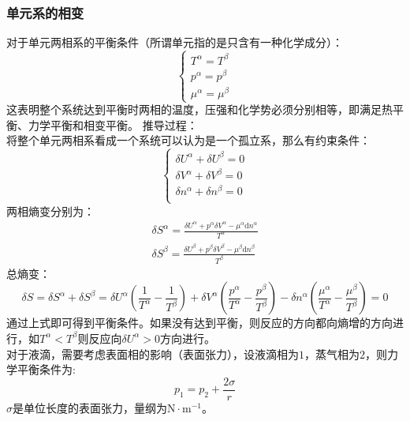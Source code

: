 \documentclass[12pt]{article}
\begin{document}
\subsubsection{单元系的相变}
\noindent
对于单元两相系的平衡条件（所谓单元指的是只含有一种化学成分）：
\begin{equation}
	\left\{\begin{split}
			T^\alpha=T^\beta\\
			p^\alpha=p^\beta\\
			\mu^\alpha=\mu^\beta
		\end{split}
	\label{x16}
	\right.
\end{equation}
这表明整个系统达到平衡时两相的温度，压强和化学势必须分别相等，即满足热平衡、力学平衡和相变平衡。
推导过程：\\
将整个单元两相系看成一个系统可以认为是一个孤立系，那么有约束条件：
\begin{equation}
	\left\{\begin{split}
		\delta U^\alpha+\delta U^\beta =0\\
		\delta V^\alpha+\delta V^\beta=0\\
		\delta n^\alpha+\delta n^\beta=0\\
\end{split}
\right.
\end{equation}
两相熵变分别为：
\begin{equation}
	\begin{split}
		\delta S^\alpha=\frac{\delta U^\alpha+p^\alpha \delta V^\alpha-\mu^\alpha \mathrm{d}n^\alpha}{T^\alpha}\\
		\delta S^\beta=\frac{\delta U^\beta+p^\beta \delta V^\beta-\mu^\beta \mathrm{d}n^\beta}{T^\beta}
	\end{split}
\end{equation}
总熵变：
\begin{equation}
	\delta S=\delta S^\alpha+\delta S^\beta=\delta U^\alpha(\frac{1}{T^\alpha}-\frac{1}{T^\beta})+\delta V^\alpha (\frac{p^\alpha}{T^\alpha}-\frac{p^\beta}{T^\beta})-\delta n^\alpha(\frac{\mu^\alpha}{T^\alpha}-\frac{\mu^\beta}{T^\beta})=0
\end{equation}
通过上式即可得到平衡条件。如果没有达到平衡，则反应的方向都向熵增的方向进行，如$T^\alpha<T^\beta$则反应向$\delta U^\alpha>0$方向进行。\\
对于液滴，需要考虑表面相的影响（表面张力），设液滴相为$1$，蒸气相为$2$，则力学平衡条件为:
\begin{equation}
	p_1=p_2+\frac{2\sigma}{r}
\end{equation}
$\sigma$是单位长度的表面张力，量纲为$\mathrm{N\cdot m^{-1}}$。
\end{document}
